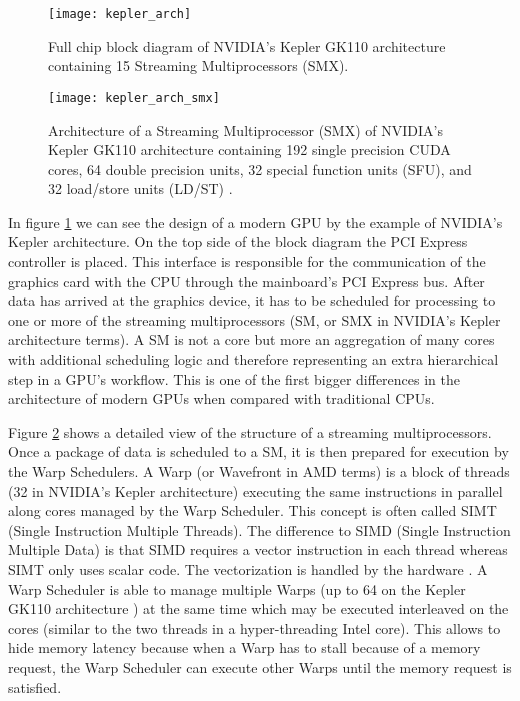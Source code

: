 \begin{figure}
\centering
\texttt{[image: kepler\_arch]}
\caption{Full chip block diagram of NVIDIA's Kepler GK110 architecture containing 15 Streaming Multiprocessors (SMX). \cite{kepler_arch}}
\label{fig:kepler_arch}
\end{figure}

\begin{figure}
\centering
\texttt{[image: kepler\_arch\_smx]}
\caption{Architecture of a Streaming Multiprocessor (SMX) of NVIDIA's Kepler GK110 architecture containing 192 single precision CUDA cores, 64 double precision units, 32 special function units (SFU), and 32 load/store units (LD/ST) \cite{kepler_arch}.}
\label{fig:kepler_arch_smx}
\end{figure}

In figure \ref{fig:kepler_arch} we can see the design of a modern GPU by the example of NVIDIA's Kepler architecture. On the top side of the block diagram the PCI Express controller is placed. This interface is responsible for the communication of the graphics card with the CPU through the mainboard's PCI Express bus. After data has arrived at the graphics device, it has to be scheduled for processing to one or more of the streaming multiprocessors (SM, or SMX in NVIDIA's Kepler architecture terms). A SM is not a core but more an aggregation of many cores with additional scheduling logic and therefore representing an extra hierarchical step in a GPU's workflow. This is one of the first bigger differences in the architecture of modern GPUs when compared with traditional CPUs.

Figure \ref{fig:kepler_arch_smx} shows a detailed view of the structure of a streaming multiprocessors. Once a package of data is scheduled to a SM, it is then prepared for execution by the Warp Schedulers. A Warp (or Wavefront in AMD terms) is a block of threads (32 in NVIDIA's Kepler architecture) executing the same instructions in parallel along cores managed by the Warp Scheduler. This concept is often called SIMT (Single Instruction Multiple Threads). The difference to SIMD (Single Instruction Multiple Data) is that SIMD requires a vector instruction in each thread whereas SIMT only uses scalar code. The vectorization is handled by the hardware \cite[p.99]{gpu_optimizations}. A Warp Scheduler is able to manage multiple Warps (up to 64 on the Kepler GK110 architecture \cite[p.7]{kepler_arch}) at the same time which may be executed interleaved on the cores (similar to the two threads in a hyper-threading Intel core). This allows to hide memory latency because when a Warp has to stall because of a memory request, the Warp Scheduler can execute other Warps until the memory request is satisfied.

